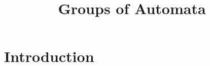 \documentclass[mat1]{fmfdeloTS}
\title{Groups of Automata} %
\begin{document}


\section{Introduction}



\bigskip
\begin{thebibliography}{99}


\end{thebibliography}
\end{document}
